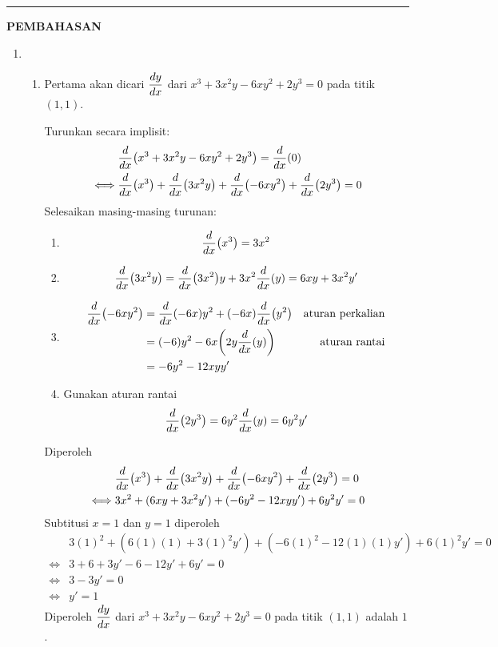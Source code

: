 \vspace{0.2cm}
\hrule height 1pt
\vspace{0.5cm}
\begin{center}
    \textbf{\large{PEMBAHASAN}}
\end{center}
\begin{enumerate}[leftmargin=*, label={\arabic*}.]
\item 
\begin{enumerate}[label={\alph*}.]
    \item Pertama akan dicari $\displaystyle\frac{dy}{dx}$ dari 
    $x^{3}+3x^{2}y-6xy^{2}+2y^{3}=0$ pada titik $(1,1)$.

    Turunkan secara implisit:
    \begin{align*}
        &\drv{x}{x^{3}+3x^{2}y-6xy^{2}+2y^{3}}=\drv{x}{0}\\
        \iff &\drv{x}{x^{3}}+\drv{x}{3x^{2}y}+\drv{x}{-6xy^{2}}
        +\drv{x}{2y^{3}} = 0
    \end{align*}
    Selesaikan masing-masing turunan:
    \begin{enumerate}[label={\arabic*})]
    \item \[
    \drv{x}{x^{3}} = 3x^{2}
    \]
    \item \[
    \drv{x}{3x^{2}y} = \drv{x}{3x^{2}}y+3x^{2}\drv{x}{y} = 6xy+3x^{2}y'
    \]
    \item 
    \begin{align*}
        \drv{x}{-6xy^{2}} &= \drv{x}{-6x}y^{2} + (-6x)\drv{x}{y^{2}}
        &\text{aturan perkalian}\\
        &=(-6)y^{2}-6x\brk*{2y\drv{x}{y}}
        &\text{aturan rantai}\\
        &=-6y^{2}-12xyy'
    \end{align*}
    \item Gunakan aturan rantai
    \begin{align*}
        \drv{x}{2y^{3}} = 6y^{2}\drv{x}{y} = 6y^{2}y'
    \end{align*}
    \end{enumerate}
    Diperoleh
    \begin{align*}
        &\drv{x}{x^{3}}+\drv{x}{3x^{2}y}+\drv{x}{-6xy^{2}}+\drv{x}{2y^{3}} = 0\\
        \iff &3x^{2}+(6xy+3x^{2}y')+(-6y^2-12xyy')+6y^{2}y'=0
    \end{align*}
    Subtitusi $x=1$ dan $y=1$ diperoleh
    \begin{align*}
        &3(1)^{2}+(6(1)(1)+3(1)^{2}y')+(-6(1)^{2}-12(1)(1)y')+6(1)^2y'=0\\
        \iff &3+6+3y'-6-12y'+6y'=0\\
        \iff &3-3y'=0\\
        \iff &y' = 1
    \end{align*}
    Diperoleh $\displaystyle\frac{dy}{dx}$ dari 
    $x^{3}+3x^{2}y-6xy^{2}+2y^{3}=0$ pada titik $(1,1)$ adalah $1$.


\end{enumerate}
\end{enumerate}
